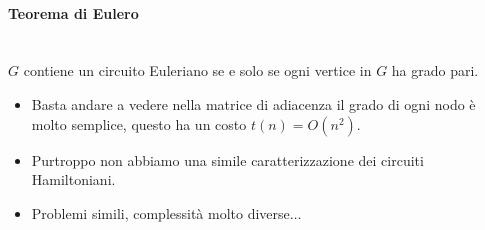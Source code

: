 \documentclass{article}
\begin{document}
\paragraph{Teorema di Eulero}\mbox{}\\
$G$ contiene un circuito Euleriano se e solo se ogni vertice in $G$ ha grado pari.

\begin{itemize}
    \item Basta andare a vedere nella matrice di adiacenza il grado di ogni nodo è
          molto semplice, questo ha un costo $t(n)=O(n^2)$.
    \item Purtroppo non abbiamo una simile caratterizzazione dei circuiti Hamiltoniani.
    \item Problemi simili, complessità molto diverse$\dots$
\end{itemize}
\end{document}
